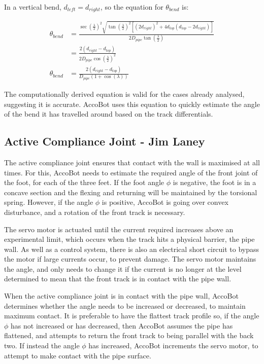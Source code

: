 \documentclass[11pt]{article}		%
\begin{document}
			In a vertical bend, $d_{left} = d_{right}$, so the equation for $\theta_{bend}$ is:
			
			\begin{align*}
				\theta_{bend} &= \frac{ \sec \left( \frac{\lambda}{2} \right)^2 \sqrt{ \tan \left( \frac{\lambda}{2} \right)^2 \left[ \left( 2 d_{right} \right)^2 + 4 d_{top} \left( d_{top} - 2 d_{right} \right) \right] } }{2 D_{pipe} \tan \left( \frac{\lambda}{2} \right)}
				\\
				&= \frac{2 \left( d_{right} - d_{top} \right)}{2 D_{pipe} \cos \left( \frac{\lambda}{2} \right)^2}
				\\
				\theta_{bend} &= \frac{2 \left( d_{right} - d_{top} \right)}{D_{pipe} \left( 1 + \cos \left( \lambda \right) \right)}
			\end{align*}
			
			The computationally derived equation is valid for the cases already analysed, suggesting it is accurate.
			AccoBot uses this equation to quickly estimate the angle of the bend it has travelled around based on the track differentials.
		 		
		\subsection[Active Compliance Joint]{Active Compliance Joint - Jim Laney} \label{complianceControl}
		
			The active compliance joint ensures that contact with the wall is maximised at all times.
			For this, AccoBot needs to estimate the required angle of the front joint of the foot, for each of the three feet.
			If the foot angle $\phi$ is negative, the foot is in a concave section and the flexing and returning will be maintained by the torsional spring.
			However, if the angle $\phi$ is positive, AccoBot is going over convex disturbance, and a rotation of the front track is necessary.
			
			The servo motor is actuated until the current required increases above an experimental limit, which occurs when the track hits a physical barrier, the pipe wall.
			As well as a control system, there is also an electrical short circuit to bypass the motor if large currents occur, to prevent damage.
			The servo motor maintains the angle, and only needs to change it if the current is no longer at the level determined to mean that the front track is in contact with the pipe wall.
			
			When the active compliance joint is in contact with the pipe wall, AccoBot determines whether the angle needs to be increased or decreased, to maintain maximum contact.
			It is preferable to have the flattest track profile so, if the angle $\phi$ has not increased or has decreased, then AccoBot assumes the pipe has flattened, and attempts to return the front track to being parallel with the back two.
			If instead the angle $\phi$ has increased, AccoBot increments the servo motor, to attempt to make contact with the pipe surface.
			
\end{document}
